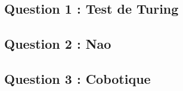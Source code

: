 \subsection{Question 1 : Test de Turing}

\subsection{Question 2 : Nao}

\subsection{Question 3 : Cobotique}
